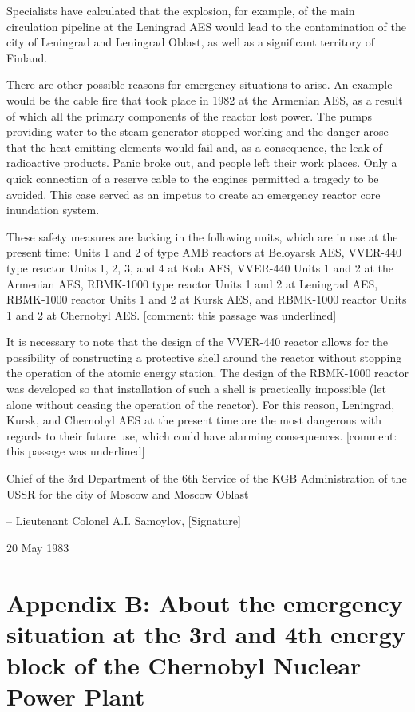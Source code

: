 \documentclass[openright]{bookest}
\begin{document}
Specialists have calculated that the explosion, for example, of the main circulation pipeline at the Leningrad AES would lead to the contamination of the city of Leningrad and Leningrad Oblast, as well as a significant territory of Finland.

There are other possible reasons for emergency situations to arise. An example would be the cable fire that took place in 1982 at the Armenian AES, as a result of which all the primary components of the reactor lost power. The pumps providing water to the steam generator stopped working and the danger arose that the heat-emitting elements would fail and, as a consequence, the leak of radioactive products. Panic broke out, and people left their work places. Only a quick connection of a reserve cable to the engines permitted a tragedy to be avoided. This case served as an impetus to create an emergency reactor core inundation system.

These safety measures are lacking in the following units, which are in use at the present time: Units 1 and 2 of type AMB reactors at Beloyarsk AES, VVER-440 type reactor Units 1, 2, 3, and 4 at Kola AES, VVER-440 Units 1 and 2 at the Armenian AES, RBMK-1000 type reactor Units 1 and 2 at Leningrad AES, RBMK-1000 reactor Units 1 and 2 at Kursk AES, and RBMK-1000 reactor Units 1 and 2 at Chernobyl AES. [comment: this passage was underlined]

It is necessary to note that the design of the VVER-440 reactor allows for the possibility of constructing a protective shell around the reactor without stopping the operation of the atomic energy station. The design of the RBMK-1000 reactor was developed so that installation of such a shell is practically impossible (let alone without ceasing the operation of the reactor). For this reason, Leningrad, Kursk, and Chernobyl AES at the present time are the most dangerous with regards to their future use, which could have alarming consequences. [comment: this passage was underlined]

Chief of the 3rd Department of the 6th Service of the KGB Administration of the USSR for the city of Moscow and Moscow Oblast

\begin{flushright}\small{
-- Lieutenant Colonel A.I. Samoylov, [Signature]
}\end{flushright}

20 May 1983

\chapter*{Appendix B: About the emergency situation at the 3rd and 4th energy block of the Chernobyl Nuclear Power Plant}
\end{document}
